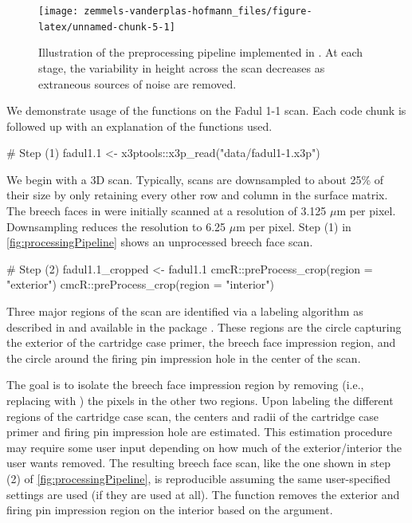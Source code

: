 \begin{Schunk}
\begin{figure}[htbp]

{\centering \texttt{[image: zemmels-vanderplas-hofmann\_files/figure-latex/unnamed-chunk-5-1]} 

}

\caption{\label{fig:processingPipeline} Illustration of the  preprocessing pipeline implemented in .  At each stage, the variability in height across the scan decreases as extraneous sources of noise are removed.}\label{fig:unnamed-chunk-5}
\end{figure}
\end{Schunk}

We demonstrate usage of the  functions on the Fadul
1-1 scan. Each code chunk is followed up with an explanation of the
functions used.

\begin{Schunk}
\begin{Sinput}
# Step (1)
fadul1.1 <- x3ptools::x3p_read("data/fadul1-1.x3p")
\end{Sinput}
\end{Schunk}

We begin with a 3D scan. Typically, scans are downsampled to about 25\%
of their size by only retaining every other row and column in the
surface matrix. The breech faces in \citet{fadul_empirical_2011} were
initially scanned at a resolution of 3.125 \(\mu\)m per pixel.
Downsampling reduces the resolution to 6.25 \(\mu\)m per pixel. Step (1)
in \autoref{fig:processingPipeline} shows an unprocessed breech face
scan.

\begin{Schunk}
\begin{Sinput}
# Step (2)
fadul1.1_cropped <- fadul1.1 %
  cmcR::preProcess_crop(region = "exterior") %
  cmcR::preProcess_crop(region = "interior")
\end{Sinput}
\end{Schunk}

Three major regions of the scan are identified via a labeling algorithm
as described in \citet{hesselink_concurrent_2001} and available in the
 package \citep{imager}. These regions are the circle
capturing the exterior of the cartridge case primer, the breech face
impression region, and the circle around the firing pin impression hole
in the center of the scan.

The goal is to isolate the breech face impression region by removing
(i.e., replacing with ) the pixels in the other two regions.
Upon labeling the different regions of the cartridge case scan, the
centers and radii of the cartridge case primer and firing pin impression
hole are estimated. This estimation procedure may require some user
input depending on how much of the exterior/interior the user wants
removed. The resulting breech face scan, like the one shown in step (2)
of \autoref{fig:processingPipeline}, is reproducible assuming the same
user-specified settings are used (if they are used at all). The
 function removes the exterior and firing pin
impression region on the interior based on the  argument.

